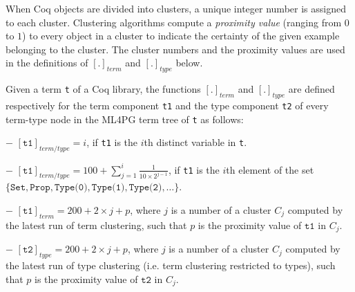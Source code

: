 When Coq objects are divided into clusters, a unique integer number is assigned to each cluster. Clustering algorithms compute 
a \emph{proximity value} (ranging from $0$ to $1$) to every object in a cluster to indicate the certainty of the given example belonging 
to the cluster. The cluster numbers and the proximity values are used in the definitions of $[.]_{term}$ and $[.]_{type}$ below.


\begin{definition}\label{def:funterm}
Given a term  \lstinline?t? of a Coq library, the functions $[.]_{term}$ and $[.]_{type}$ are defined respectively for the term component \lstinline?t1?
and the type component \lstinline?t2? of every term-type node in the ML4PG term tree of \lstinline?t? as follows:

$-$ $[\texttt{t1}]_{term/type}=i$, if \lstinline?t1? is the $i$th distinct variable in \lstinline?t?. 

$-$ $[\texttt{t1}]_{term/type}=100+\sum_{j=1}^i\frac{1}{10\times 2^{j-1}}$, if \lstinline?t1? is the $i$th element of the set\\ $\{\texttt{Set},\texttt{Prop},\texttt{Type(0)},
\texttt{Type(1)}, \texttt{Type(2)},\ldots\}$.
 
$-$ $[\texttt{t1}]_{term}=200+2\times j + p$, where $j$ is a number of a cluster $C_j$ computed by the latest run of term clustering, %
such that $p$ is the proximity value of $\texttt{t1}$ in $C_j$. 


 
$-$ $[\texttt{t2}]_{type}=200+2\times j + p$, where $j$ is a number of a cluster $C_j$ computed by the latest run of type clustering (i.e. term clustering restricted to types),
such that $p$ is the proximity value of $\texttt{t2}$ in $C_j$.
% 
\end{definition}



